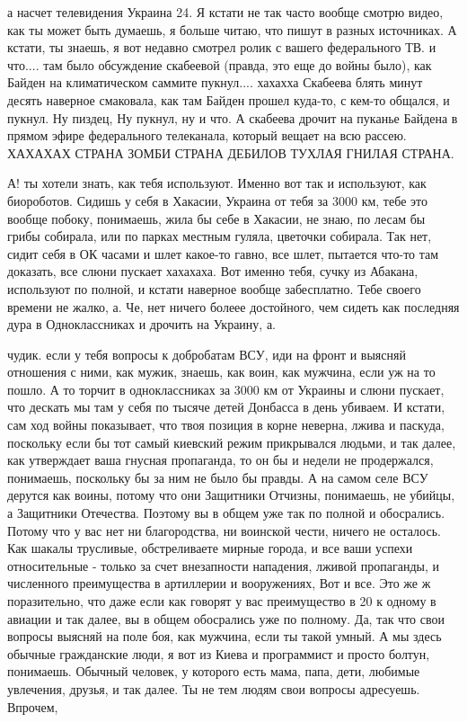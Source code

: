 а насчет телевидения Украина 24. Я кстати не так часто вообще смотрю видео, как
ты может быть думаешь, я больше читаю, что пишут в разных источниках. А кстати,
ты знаешь, я вот недавно смотрел ролик с вашего федерального ТВ. и что.... там
было обсуждение скабеевой (правда, это еще до войны было), как Байден на
климатическом саммите пукнул.... хахахха Скабеева блять минут десять наверное
смаковала, как там Байден прошел куда-то, с кем-то общался, и пукнул. Ну
пиздец, Ну пукнул, ну и что. А скабеева дрочит на пуканье Байдена в прямом
эфире федерального телеканала, который вещает на всю рассею. ХАХАХАХ СТРАНА
ЗОМБИ СТРАНА ДЕБИЛОВ ТУХЛАЯ ГНИЛАЯ СТРАНА.

А! ты хотели знать, как тебя используют. Именно вот так и используют, как
биороботов. Сидишь у себя в Хакасии, Украина от тебя за 3000 км, тебе это
вообще побоку, понимаешь, жила бы себе в Хакасии, не знаю, по лесам бы грибы
собирала, или по парках местным гуляла, цветочки собирала. Так нет, сидит себя
в ОК часами и шлет какое-то гавно, все шлет, пытается что-то там доказать, все
слюни пускает хахахаха. Вот именно тебя, сучку из Абакана, используют по
полной, и кстати наверное вообще забесплатно. Тебе своего времени не жалко, а.
Че, нет ничего болеее достойного, чем сидеть как последняя дура в
Одноклассниках и дрочить на Украину, а.

чудик. если у тебя вопросы к добробатам ВСУ, иди на фронт и выясняй отношения с
ними, как мужик, знаешь, как воин, как мужчина, если уж на то пошло. А то
торчит в одноклассниках за 3000 км от Украины и слюни пускает, что дескать мы
там у себя по тысяче детей Донбасса в день убиваем. И кстати, сам ход войны
показывает, что твоя позиция в корне неверна, лжива и паскуда, поскольку если
бы тот самый киевский режим прикрывался людьми, и так далее, как утверждает
ваша гнусная пропаганда, то он бы и недели не продержался, понимаешь, поскольку
бы за ним не было бы правды. А на самом селе ВСУ дерутся как воины, потому что
они Защитники Отчизны, понимаешь, не убийцы, а Защитники Отечества. Поэтому вы
в общем уже так по полной и обосрались. Потому что у вас нет ни благородства,
ни воинской чести, ничего не осталось. Как шакалы трусливые, обстреливаете
мирные города, и все ваши успехи относительные - только за счет внезапности
нападения, лживой пропаганды, и численного преимущества в артиллерии и
вооружениях, Вот и все. Это же ж поразительно, что даже если как говорят у вас
преимущество в 20 к одному в авиации и так далее, вы в общем обосрались уже по
полному. Да, так что свои вопросы выясняй на поле боя, как мужчина, если ты
такой умный. А мы здесь обычные гражданские люди, я вот из Киева и программист
и просто болтун, понимаешь. Обычный человек, у которого есть мама, папа, дети,
любимые увлечения, друзья, и так далее. Ты не тем людям свои вопросы адресуешь.
Впрочем,

